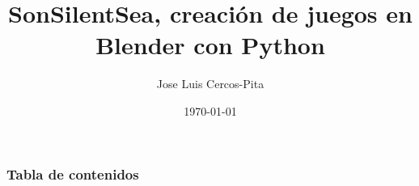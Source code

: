 \documentclass[8pt,compress]{beamer}
\begin{document}
\title{SonSilentSea, creación de juegos en Blender con Python}  
\author{Jose Luis Cercos-Pita}
\date{\today} 

\begin{frame}
\titlepage
\end{frame}

\begin{frame} \frametitle{Tabla de contenidos}
\tableofcontents
\end{frame} 











\end{document}
